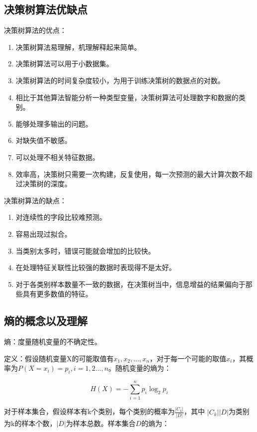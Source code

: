 \subsection{决策树算法优缺点}

决策树算法的优点：

\begin{enumerate}\itemsep0em 
		\item 决策树算法易理解，机理解释起来简单。
		\item 决策树算法可以用于小数据集。
		\item 决策树算法的时间复杂度较小，为用于训练决策树的数据点的对数。
		\item 相比于其他算法智能分析一种类型变量，决策树算法可处理数字和数据的类别。
		\item 能够处理多输出的问题。 
		\item 对缺失值不敏感。
		\item 可以处理不相关特征数据。
		\item 效率高，决策树只需要一次构建，反复使用，每一次预测的最大计算次数不超过决策树的深度。
\end{enumerate}

决策树算法的缺点：

\begin{enumerate}\itemsep0em 
		\item 对连续性的字段比较难预测。
		\item 容易出现过拟合。
		\item 当类别太多时，错误可能就会增加的比较快。
		\item 在处理特征关联性比较强的数据时表现得不是太好。
		\item 对于各类别样本数量不一致的数据，在决策树当中，信息增益的结果偏向于那些具有更多数值的特征。
\end{enumerate}

\subsection{熵的概念以及理解}

熵：度量随机变量的不确定性。  

定义：假设随机变量X的可能取值有$x_{1},x_{2},...,x_{n}$，对于每一个可能的取值$x_{i}$，其概率为$P(X=x_{i})=p_{i},i=1,2...,n$。随机变量的熵为：

$$
H(X)=-\sum_{i=1}^{n}p_{i}\log_{2}p_{i}
$$

对于样本集合，假设样本有k个类别，每个类别的概率为$\frac{|C_{k}|}{|D|}$，其中 ${|C_{k}|}{|D|}$为类别为k的样本个数，$|D|$为样本总数。样本集合$D$的熵为：

